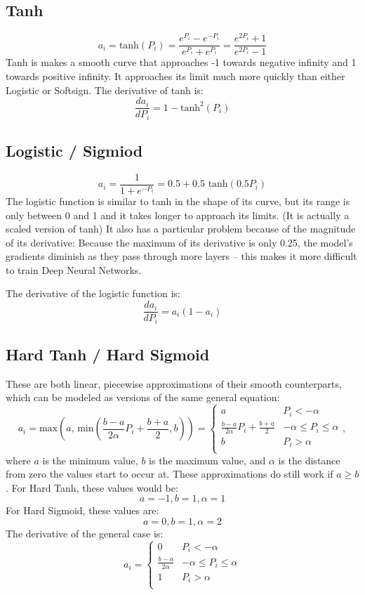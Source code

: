 \documentclass[fleqn]{article}
\begin{document}
\subsection{Tanh}
\[ a_i = \text{tanh}(P_i) = \frac{e^{P_i} - e^{-P_i}}{e^{P_i} + e^{P_i}} =
\frac{e^{2P_i} +1}{e^{2P_i} -1} \]
Tanh is makes a smooth curve that approaches -1 towards negative infinity
and 1 towards positive infinity. It approaches its limit much more quickly
than either Logistic or Softsign.
The derivative of tanh is:
\[ \frac{d a_i}{d P_i} = 1 - \text{tanh}^2(P_i) \]

\subsection{Logistic / Sigmiod}
\[ a_i = \frac{1}{1 + e^{-P_i}} = 0.5 + 0.5 \text{ tanh}(0.5 P_i) \]
The logistic function is similar to tanh in the shape of its curve, but
its range is only between 0 and 1 and it takes longer to approach its
limits. (It is actually a scaled version of tanh) It also has a particular
problem because of the magnitude of its derivative: Because the maximum of
its derivative is only 0.25, the model's gradients diminish as they pass
through more layers -- this makes it more difficult to train Deep Neural
Networks.

The derivative of the logistic function is:
\[ \frac{d a_i}{d P_i} = a_i (1 - a_i) \]

\subsection{Hard Tanh / Hard Sigmoid}
These are both linear, piecewise approximations of their smooth
counterparts, which can be modeled as versions of the same general
equation:
\[ a_i = \text{max}(a, \, \text{min}(
\frac{b-a}{2 \alpha} P_i + \frac{b+a}{2}, b)) = \begin{cases}
	a & P_i < -\alpha \\
	\frac{b-a}{2 \alpha} P_i + \frac{b+a}{2} &
		-\alpha \leq P_i \leq \alpha \\
	b & P_i > \alpha \\
\end{cases}, \]
where $a$ is the minimum value, $b$ is the maximum value, and $\alpha$ is
the distance from zero the values start to occur at. These approximations
do still work if $a \geq b$.
 For Hard Tanh, these
values would be:
\[a=-1, b=1, \alpha=1\]
For Hard Sigmoid, these values are:
\[a=0, b=1, \alpha=2\]
The derivative of the general case is:
\[ a_i = \begin{cases}
	0 & P_i < -\alpha \\
	\frac{b-a}{2 \alpha} & -\alpha \leq P_i \leq \alpha \\
	1 & P_i > \alpha \\
\end{cases} \]
\end{document}

